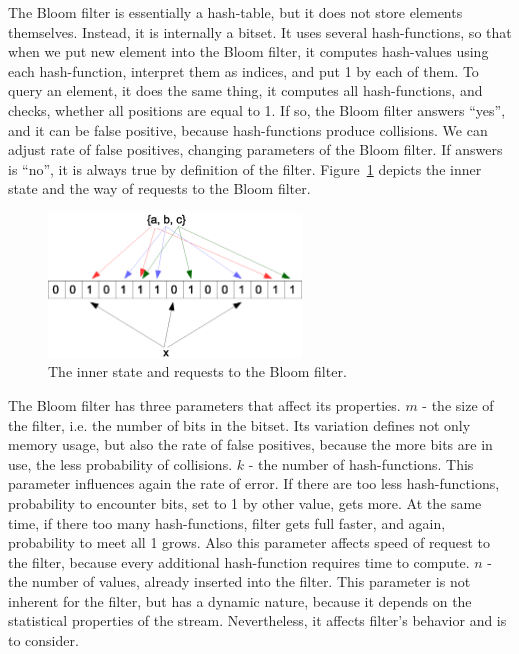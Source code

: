 The Bloom filter is essentially a hash-table, but it does not store elements themselves.
Instead, it is internally a bitset.
It uses several hash-functions, so that when we put new element into the Bloom filter, it computes hash-values using each hash-function, interpret them as indices, and put 1 by each of them.
To query an element, it does the same thing, it computes all hash-functions, and checks, whether all positions are equal to 1.
If so, the Bloom filter answers ``yes'', and it can be false positive, because hash-functions produce collisions.
We can adjust rate of false positives, changing parameters of the Bloom filter.
If answers is ``no'', it is always true by definition of the filter.
Figure~\ref{fig:bloom_filter} depicts the inner state and the way of requests to the Bloom filter.

\begin{figure}[H]
  \centering
  \includegraphics [width=0.6\textwidth]{images/BloomFilter}
  \caption{The inner state and requests to the Bloom filter.}
  \label{fig:bloom_filter}
\end{figure}

The Bloom filter has three parameters that affect its properties.
$m$ - the size of the filter, i.e. the number of bits in the bitset.
Its variation defines not only memory usage, but also the rate of false positives, because the more bits are in use, the less probability of collisions.
$k$ - the number of hash-functions.
This parameter influences again the rate of error.
If there are too less hash-functions, probability to encounter bits, set to 1 by other value, gets more.
At the same time, if there too many hash-functions, filter gets full faster, and again, probability to meet all 1 grows.
Also this parameter affects speed of request to the filter, because every additional hash-function requires time to compute.
$n$ - the number of values, already inserted into the filter.
This parameter is not inherent for the filter, but has a dynamic nature, because it depends on the statistical properties of the stream.
Nevertheless, it affects filter's behavior and is to consider.


